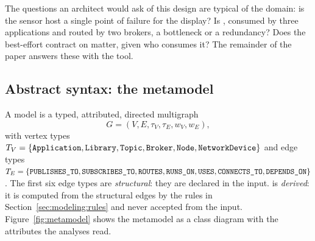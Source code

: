 The questions an architect would ask of this design are typical of the domain: is the sensor host a single point of failure for the display? Is , consumed by three applications and routed by two brokers, a bottleneck or a redundancy? Does the best-effort contract on  matter, given who consumes it? The remainder of the paper answers these with the tool.

\subsection{Abstract syntax: the metamodel}
\label{sec:modeling:metamodel}

A \sag{} model is a typed, attributed, directed multigraph
\begin{equation}
G = (V, E, \tau_V, \tau_E, w_V, w_E),
\end{equation}
with vertex types $T_V = \{\texttt{Application}, \texttt{Library}, \texttt{Topic}, \texttt{Broker}, \texttt{Node}, \texttt{NetworkDevice}\}$ and edge types $T_E = \{\texttt{PUBLISHES\_TO}, \texttt{SUBSCRIBES\_TO}, \texttt{ROUTES}, \texttt{RUNS\_ON}, \texttt{USES}, \texttt{CONNECTS\_TO}, \texttt{DEPENDS\_ON}\}$. The first six edge types are \emph{structural}: they are declared in the input.  is \emph{derived}: it is computed from the structural edges by the rules in Section~\ref{sec:modeling:rules} and never accepted from the input. Figure~\ref{fig:metamodel} shows the metamodel as a class diagram with the attributes the analyses read.

